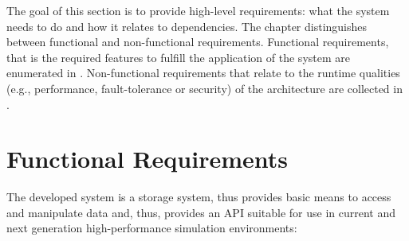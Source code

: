 \begin{chapterIntro}
The goal of this section is to provide high-level requirements: what the system needs to do and how it relates to dependencies. The chapter distinguishes between functional and non-functional requirements.
Functional requirements, that is the required features to fulfill the application of the system are enumerated in .
Non-functional requirements that relate to the runtime qualities (e.g., performance, fault-tolerance or security) of the architecture are collected in .
\end{chapterIntro}

\label{chap:requirements}


\section{Functional Requirements}
\label{sec: requirements/functional}

The developed system is a storage system, thus provides basic means to access and manipulate data
and, thus, provides an API suitable for use in current and next generation high-performance simulation environments:

